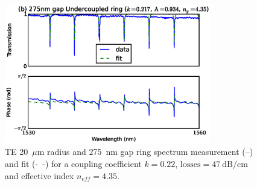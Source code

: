 \documentclass[journal]{IEEEtran}
\begin{document}
     
\begin{figure}[htb]
\centerline{\includegraphics[width=9cm]{r20g275TE_fitPhaseAmp}}
\caption{TE 20~$\mu$m radius and 275~nm gap ring spectrum measurement (--) and fit (-~-) for a coupling coefficient $k=0.22$, $\mathrm{losses=47~dB/cm}$ and effective index $n_{eff}=4.35$.}
\label{fig:undercoupled}
\end{figure}

\end{document}
